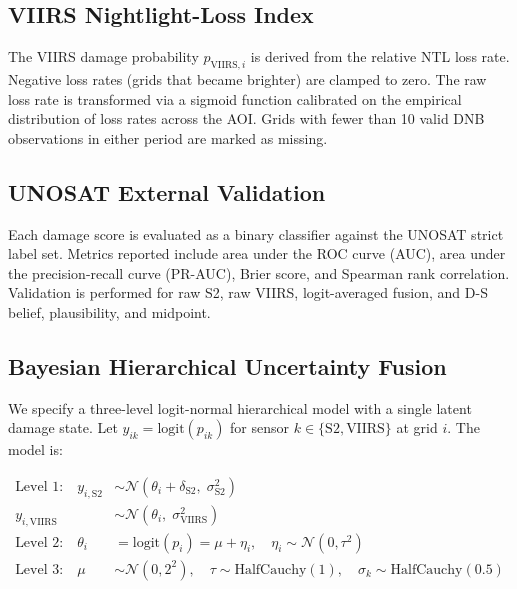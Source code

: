 \documentclass[wcp]{jmlr}
\begin{document}
\subsection{VIIRS Nightlight-Loss Index}

The VIIRS damage probability $p_{\text{VIIRS},i}$ is derived from the
relative NTL loss rate. Negative loss rates (grids that became brighter)
are clamped to zero. The raw loss rate is transformed via a sigmoid
function calibrated on the empirical distribution of loss rates across
the AOI. Grids with fewer than 10 valid DNB observations in either
period are marked as missing.

\subsection{UNOSAT External Validation}

Each damage score is evaluated as a binary classifier against the UNOSAT
strict label set. Metrics reported include area under the ROC curve (AUC),
area under the precision-recall curve (PR-AUC), Brier score, and Spearman
rank correlation. Validation is performed for raw S2, raw VIIRS,
logit-averaged fusion, and D-S belief, plausibility, and midpoint.

\subsection{Bayesian Hierarchical Uncertainty Fusion}\label{sec:bayes}

We specify a three-level logit-normal hierarchical model with a single
latent damage state. Let $y_{ik} = \text{logit}(p_{ik})$ for sensor
$k \in \{\text{S2}, \text{VIIRS}\}$ at grid $i$. The model is:

\begin{align}
\text{Level 1:}\quad
  y_{i,\text{S2}} &\sim \mathcal{N}(\theta_i + \delta_{\text{S2}},\;
                     \sigma_{\text{S2}}^2) \label{eq:L1s2}\\
  y_{i,\text{VIIRS}} &\sim \mathcal{N}(\theta_i,\;
                         \sigma_{\text{VIIRS}}^2) \label{eq:L1v}\\
\text{Level 2:}\quad
  \theta_i &= \text{logit}(p_i) = \mu + \eta_i,\quad
  \eta_i \sim \mathcal{N}(0, \tau^2) \label{eq:L2}\\
\text{Level 3:}\quad
  \mu &\sim \mathcal{N}(0, 2^2),\quad
  \tau \sim \text{HalfCauchy}(1),\quad
  \sigma_k \sim \text{HalfCauchy}(0.5) \label{eq:L3}
\end{align}
\end{document}
